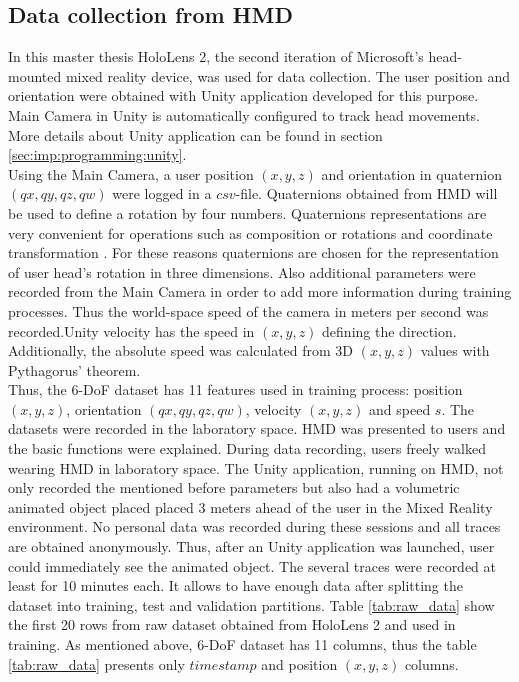 \subsection{Data collection from HMD}
\label{sec:design:dataset:HL}
In this master thesis HoloLens 2, the second iteration of Microsoft's head-mounted mixed reality device, was used for data collection. The user position and orientation were obtained with Unity application developed for this purpose. Main Camera in Unity is automatically configured to track head movements. More details about Unity application can be found in section \ref{sec:imp:programming:unity}.\\
Using the Main Camera, a user position $(x, y, z)$ and orientation in quaternion $(qx, qy, qz, qw)$ were logged in a $csv$-file. Quaternions obtained from HMD will be used to define a rotation by four numbers. Quaternions representations are very convenient for operations such as composition or rotations and coordinate transformation \cite{principles_robot_motion_book}. For these reasons quaternions are chosen for the representation of user head's rotation in three dimensions. Also additional parameters were recorded from the Main Camera in order to add more information during training processes. Thus the world-space speed of the camera in meters per second was recorded.Unity velocity has the speed in $(x, y, z)$ defining the direction. Additionally, the absolute speed was calculated from 3D $(x, y, z)$ values with Pythagorus' theorem.\\
Thus, the 6-DoF dataset has 11 features used in training process: position $(x, y, z)$, orientation  $(qx, qy, qz, qw)$, velocity $(x, y, z)$ and speed $s$.
The datasets were recorded in the laboratory space. HMD was presented to users and the basic functions were explained. During data recording, users freely walked wearing HMD in laboratory space. The Unity application, running on HMD, not only recorded the mentioned before parameters but also had a volumetric animated object placed placed 3 meters ahead of the user in the Mixed Reality environment. No personal data was recorded during these sessions and all traces are obtained anonymously. Thus, after an Unity application was launched, user could immediately see the animated object. The several traces were recorded at least for 10 minutes each. It allows to have enough data after splitting the dataset into training, test and validation partitions. Table \ref{tab:raw_data} show the first 20 rows from raw dataset obtained from HoloLens 2 and used in training. As mentioned above, 6-DoF dataset has 11 columns, thus the table \ref{tab:raw_data} presents only $timestamp$ and position $(x, y, z)$ columns. 

